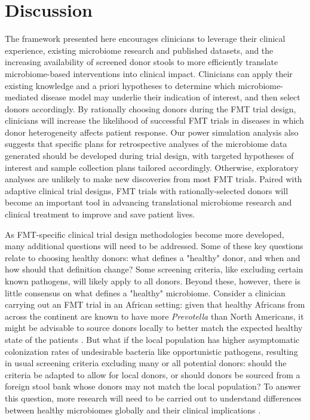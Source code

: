 \section{Discussion}

The framework presented here encourages clinicians to leverage their clinical experience, existing microbiome research and published datasets, and the increasing availability of screened donor stools to more efficiently translate microbiome-based interventions into clinical impact.
Clinicians can apply their existing knowledge and a priori hypotheses to determine which microbiome-mediated disease model may underlie their indication of interest, and then select donors accordingly.
By rationally choosing donors during the FMT trial design, clinicians will increase the likelihood of successful FMT trials in diseases in which donor heterogeneity affects patient response.
Our power simulation analysis also suggests that specific plans for retrospective analyses of the microbiome data generated should be developed during trial design, with targeted hypotheses of interest and sample collection plans tailored accordingly.
Otherwise, exploratory analyses are unlikely to make new discoveries from most FMT trials. Paired with adaptive clinical trial designs, FMT trials with rationally-selected donors will become an important tool in advancing translational microbiome research and clinical treatment to improve and save patient lives.

As FMT-specific clinical trial design methodologies become more developed, many additional questions will need to be addressed.
Some of these key questions relate to choosing healthy donors: what defines a "healthy" donor, and when and how should that definition change?
Some screening criteria, like excluding certain known pathogens, will likely apply to all donors.
Beyond these, however, there is little consensus on what defines a "healthy" microbiome.
Consider a clinician carrying out an FMT trial in an African setting: given that healthy Africans from across the continent are known to have more \textit{Prevotella} than North Americans, it might be advisable to source donors locally to better match the expected healthy state of the patients \cite{Ou2013,Yatsunenko2012,DeFilippo2010}.
But what if the local population has higher asymptomatic colonization rates of undesirable bacteria like opportunistic pathogens, resulting in usual screening criteria excluding many or all potential donors: should the criteria be adapted to allow for local donors, or should donors be sourced from a foreign stool bank whose donors may not match the local population?
To answer this question, more research will need to be carried out to understand differences between healthy microbiomes globally and their clinical implications \cite{Bello2018,Rabesandratana2018}.

